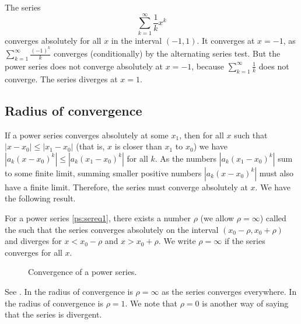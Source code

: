 \documentclass[12pt]{book}
\begin{document}
\begin{example} \label{ps:1kex}
The series
\begin{equation*}
\sum_{k=1}^\infty \frac{1}{k} x^k
\end{equation*}
converges absolutely for all $x$ in the interval $(-1,1)$.
It converges at $x=-1$,
as
$\sum_{k=1}^\infty \frac{{(-1)}^k}{k}$ converges (conditionally)
by the alternating series
test.
But the power series does not converge absolutely at $x=-1$, because
$\sum_{k=1}^\infty \frac{1}{k}$ does not converge.
The series
diverges at $x=1$.
\end{example}

\subsection{Radius of convergence}

If a power series converges absolutely
at some $x_1$, then for all $x$ such that
$\lvert x - x_0  \rvert \leq \lvert x_1 - x_0 \vert$ (that is, $x$ is
closer than $x_1$ to $x_0$) we have
$\left\lvert a_k {(x-x_0)}^k \right\rvert \leq
\left\lvert a_k {(x_1-x_0)}^k \right\rvert$
for all $k$.
As the numbers $\left\lvert a_k {(x_1-x_0)}^k \right\rvert$ sum to some finite
limit, summing smaller positive numbers
$\left\lvert a_k {(x-x_0)}^k \right\rvert$ must also have a finite limit.
Therefore, the series must converge
absolutely at $x$.  We have the following result.

\begin{theorem}
For a power series \eqref{ps:sereq1}, there exists a number
$\rho$ (we allow $\rho=\infty$)
called the \emph{} such that
the series converges absolutely on the interval
$(x_0-\rho,x_0+\rho)$ and diverges for $x < x_0-\rho$ and $x > x_0+\rho$.
We write $\rho=\infty$ if
the series converges for all $x$.
\end{theorem}

\begin{figure}[h!t]
\capstart
\begin{center}
\caption{Convergence of a power series.\label{ps:convfig}}
\end{center}
\end{figure}

See .
In  the radius of convergence is $\rho = \infty$
as the series converges everywhere.  In 
the radius of convergence is $\rho=1$.
We note that $\rho = 0$ is another way of saying that the series is
divergent.
\end{document}
